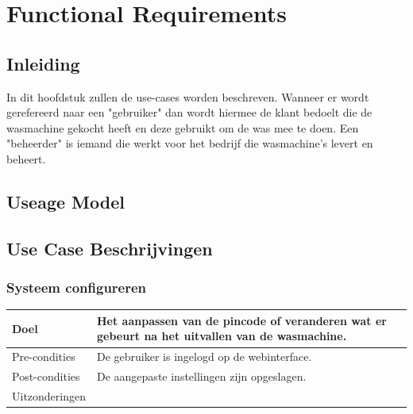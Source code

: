 \chapter{Functional Requirements}
\section{Inleiding}
In dit hoofdstuk zullen de use-cases worden beschreven.
Wanneer er wordt gerefereerd naar een "gebruiker" dan wordt hiermee de klant bedoelt die de wasmachine gekocht heeft en deze gebruikt om de was mee te doen.
Een "beheerder" is iemand die werkt voor het bedrijf die wasmachine's levert en beheert.
\newpage
\section{Useage Model}

  


\section{Use Case Beschrijvingen}

\subsection{Systeem configureren}
\begin{center}
  \begin{tabular}{ | p{4cm} | p{8.5cm} | }    \hline
    Doel & Het aanpassen van de pincode of veranderen wat er gebeurt na het uitvallen van de wasmachine. \\ \hline
    Pre-condities & De gebruiker is ingelogd op de webinterface. \\ \hline
    Post-condities & De aangepaste instellingen zijn opgeslagen. \\ \hline
    Uitzonderingen & \\
    \hline
  \end{tabular}
\end{center}


